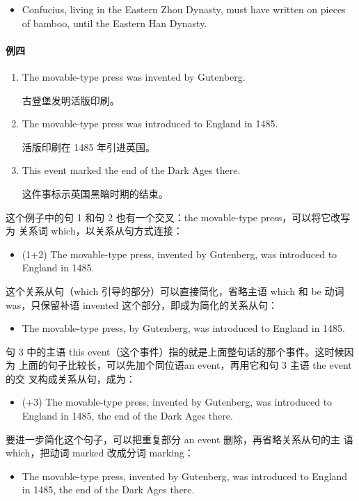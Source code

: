\begin{itemize}
\item Confucius, living in the Eastern Zhou Dynasty, must have written on
  pieces of bamboo,  until the Eastern Han Dynasty.
\end{itemize}

\paragraph{例四}

\begin{enumerate}
\item The movable-type press was invented by Gutenberg.

  古登堡发明活版印刷。
\item The movable-type press was introduced to England in 1485.

  活版印刷在 1485 年引进英国。
\item This event marked the end of the Dark Ages there.

  这件事标示英国黑暗时期的结束。
\end{enumerate}

这个例子中的句 1 和句 2 也有一个交叉：the movable-type press，可以将它改写为
关系词 which，以关系从句方式连接：
\begin{itemize}
\item (1+2) The movable-type press,  invented by Gutenberg, was
  introduced to England in 1485.
\end{itemize}
这个关系从句（which 引导的部分）可以直接简化，省略主语 which 和 be 动词
was，只保留补语 invented 这个部分，即成为简化的关系从句：
\begin{itemize}
\item The movable-type press,  by Gutenberg, was introduced to England
  in 1485.
\end{itemize}
句 3 中的主语 this event（这个事件）指的就是上面整句话的那个事件。这时候因为
上面的句子比较长，可以先加个同位语an event，再用它和句 3 主语 the event 的交
叉构成关系从句，成为：
\begin{itemize}
\item (+3) The movable-type press, invented by Gutenberg, was introduced to
  England in 1485,  the end of the Dark Ages there.
\end{itemize}
要进一步简化这个句子，可以把重复部分 an event 删除，再省略关系从句的主
语which，把动词 marked 改成分词 marking：
\begin{itemize}
\item   The movable-type press, invented by Gutenberg, was introduced to
  England in 1485,  the end of the Dark Ages there.
\end{itemize}

